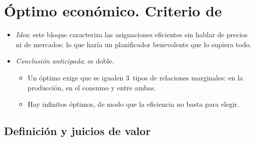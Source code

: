 \documentclass[11pt]{article}
\begin{document}
\section{Óptimo económico. Criterio de }\label{sec:optimo-pareto}

\begin{itemize}
\item \emph{Idea}: este bloque caracteriza las asignaciones eficientes sin hablar de precios ni de mercados: lo que haría un planificador benevolente que lo supiera todo.
\item \emph{Conclusión anticipada}: es doble.
  \begin{itemize}
  \item Un óptimo exige que se igualen 3~tipos de relaciones marginales: en la producción, en el consumo y entre ambas.
  \item Hay infinitos óptimos, de modo que la eficiencia no basta para elegir.
  \end{itemize}
\end{itemize}

\subsection{Definición y juicios de valor}\label{sec:definicion-juicios}
\end{document}
